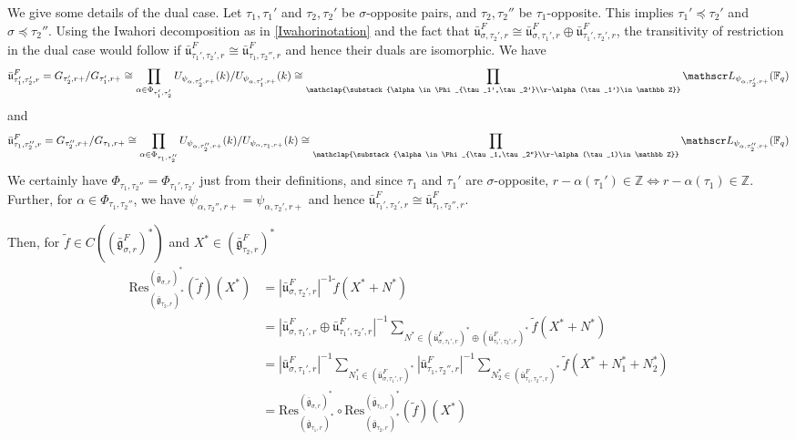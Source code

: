 \documentclass[11 pt]{article}
\numberwithin{equation}{subsection}
\theoremstyle{definition}
\theoremstyle{remark}
\theoremstyle{conjecture}
\newcommand{\bg}{\bar{\mathfrak g}}
\newcommand{\bu}{\bar{\mathfrak u}}
\newcommand{\Z}{\mathbb Z}
\newcommand{\F}{\mathbb F}
\begin{document}
 We give some details of the dual case. Let $\tau_1, \tau_1'$ and $\tau_2, \tau_2'$ be $\sigma$-opposite pairs, and $\tau_2, \tau_2''$ be $\tau_1$-opposite. This implies $\tau_1'\preceq \tau_2'$ and $\sigma \preceq \tau_2''$. Using the Iwahori decomposition as in \eqref{Iwahorinotation} and the fact that $\bu_{\sigma,\tau_2',r}^F \cong \bu_{\sigma,\tau_1',r}^F \oplus \bu_{\tau_1',\tau_2',r}^F$, the transitivity of restriction in the dual case would follow if $\bu_{\tau_1',\tau_2',r}^F \cong \bu_{\tau_1,\tau_2'',r}^F$ and hence their duals are isomorphic. We have
\begin{equation*}
 \bu_{\tau_1',\tau_2',r}^F=G_{\tau_2',r+}/{G_{\tau_1',r+}}\cong \prod_{\alpha \in \Phi_{\tau_1',\tau_2'}}  U _{\psi_{\alpha,\tau_2',r+}}(k)/{U _{\psi_{\alpha,\tau_1',r+}}}(k)\cong \prod_{\mathclap{\substack{\alpha \in \Phi_{\tau_1',\tau_2'}\\r-\alpha(\tau_1')\in \Z}}}\mathscr L_{\psi_{\alpha,\tau_2',r+}}(\F_q)
\end{equation*}
and 
\begin{equation*}
\bu_{\tau_1,\tau_2'',r}^F=G_{\tau_2'',r+}/{G_{\tau_1,r+}}\cong \prod_{\alpha \in \Phi_{\tau_1,\tau_2''}}  U _{\psi_{\alpha,\tau_2'',r+}}(k)/{U _{\psi_{\alpha,\tau_1,r+}}}(k)\cong \prod_{\mathclap{\substack{\alpha \in \Phi_{\tau_1,\tau_2''}\\r-\alpha(\tau_1)\in \Z}}}\mathscr L_{\psi_{\alpha,\tau_2'',r+}}(\F_q)
\end{equation*}
We certainly have $\Phi_{\tau_1,\tau_2''}=\Phi_{\tau_1',\tau_2'}$ just from their definitions, and since $\tau_1$ and $\tau_1'$ are $\sigma$-opposite, $r-\alpha(\tau_1')\in \Z\Longleftrightarrow r-\alpha(\tau_1)\in \Z$. Further, for $\alpha \in \Phi_{\tau_1,\tau_2''}$, we have $\psi_{\alpha,\tau_2'',r+}=\psi_{\alpha,\tau_2',r+}$ and hence $\bu_{\tau_1',\tau_2',r}^F \cong \bu_{\tau_1,\tau_2'',r}^F$.\par
Then, for $\tilde f \in C\left( (\bg_{\sigma,r}^F)^*\right) $ and $X^* \in (\bg_{\tau_2,r}^F)^*$
\begin{align*}
    \text{Res}^{(\bg_{\sigma,r})^*}_{(\bg_{\tau_2,r})^*}(\tilde f) (X^*) &= \left|\bu_{\sigma,\tau_2',r}^F\right|^{-1}\tilde f(X^*+N^*)\\
    &= \left|\bu_{\sigma,\tau_1',r}^F \oplus \bu_{\tau_1',\tau_2',r}^F\right|^{-1}\sum_{N^* \in (\bu_{\sigma,\tau_1',r}^F)^* \oplus (\bu_{\tau_1',\tau_2',r}^F)^*}\tilde f(X^*+N^*)\\
    &=\left|\bu_{\sigma,\tau_1',r}^F\right|^{-1}\sum_{N_1^* \in (\bu_{\sigma,\tau_1',r}^F)^*}\left|\bu_{\tau_1,\tau_2'',r}^F\right|^{-1}\sum_{N_2^* \in (\bu_{\tau_1,\tau_2'',r}^F)^*}\tilde f(X^*+N_1^*+N_2^*)\\
    &= \text{Res}^{(\bg_{\sigma,r})^*}_{(\bg_{\tau_1,r})^*}\circ \text{Res}^{(\bg_{\tau_1,r})^*}_{(\bg_{\tau_2,r})^*}(\tilde f)(X^*)
\end{align*}
\end{document}
